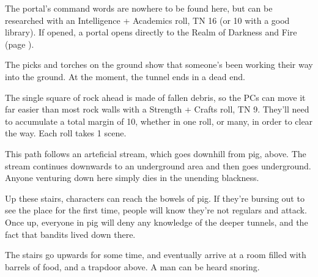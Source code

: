The portal's command words are nowhere to be found here, but can be researched with an Intelligence + Academics roll, TN 16 (or 10 with a good library).  If opened, a portal opens directly to the Realm of Darkness and Fire (page \pageref{darknessandfire}).






\begin{boxtext}
	The picks and torches on the ground show that someone's been working their way into the ground.  At the moment, the tunnel ends in a dead end.
\end{boxtext}
 
The single square of rock ahead is made of fallen debris, so the PCs can move it far easier than most rock walls with a Strength + Crafts roll, TN 9.  They'll need to accumulate a total margin of 10, whether in one roll, or many, in order to clear the way.  Each roll takes 1 scene.

\label{pigexit}

\label{slidein}

This path follows an arteficial stream, which goes downhill from \gls{pig}, above.  The stream continues downwards to an underground area and then goes underground.  Anyone venturing down here simply dies in the unending blackness.



Up these stairs, characters can reach the bowels of \gls{pig}.  If they're bursing out to see the place for the first time, people will know they're not regulars and attack.  Once up, everyone in \gls{pig} will deny any knowledge of the deeper tunnels, and the fact that bandits lived down there.


\begin{boxtext}

	The stairs go upwards for some time, and eventually arrive at a room filled with barrels of food, and a trapdoor above.  A man can be heard snoring.

\end{boxtext}

